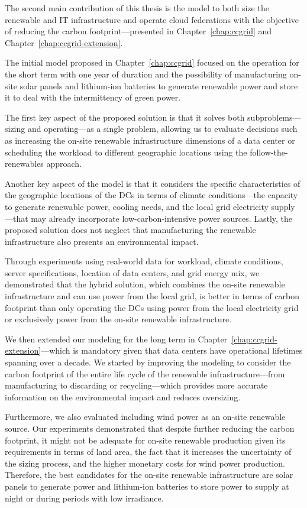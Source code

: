 The second main contribution of this thesis is the model to both size the renewable and IT infrastructure and operate cloud federations with the objective of reducing the carbon footprint---presented in Chapter~\ref{chap:ccgrid} and Chapter~\ref{chap:ccgrid-extension}. 

The initial model proposed in Chapter~\ref{chap:ccgrid} focused on the operation for the short term with one year of duration and the possibility of manufacturing on-site solar panels and lithium-ion batteries to generate renewable power and store it to deal with the intermittency of green power. 

The first key aspect of the proposed solution is that it solves both subproblems---sizing and operating---as a single problem, allowing us to evaluate decisions such as increasing the on-site renewable infrastructure dimensions of a data center or scheduling the workload to different geographic locations using the follow-the-renewables approach.


Another key aspect of the model is that it considers the specific characteristics of the geographic locations of the DCs in terms of climate conditions---the capacity to generate renewable power, cooling needs, and the local grid electricity supply---that may already incorporate low-carbon-intensive power sources. Lastly, the proposed solution does not neglect that manufacturing the renewable infrastructure also presents an environmental impact. 

Through experiments using real-world data for workload, climate conditions, server specifications, location of data centers, and grid energy mix,  we demonstrated that the hybrid solution, which combines the on-site renewable infrastructure and can use power from the local grid, is better in terms of carbon footprint than only operating the DCs using power from the local electricity grid or exclusively power from the on-site renewable infrastructure.

We then extended our modeling for the long term in Chapter~\ref{chap:ccgrid-extension}---which is mandatory given that data centers have operational lifetimes spanning over a decade. We started by improving the modeling to consider the carbon footprint of the entire life cycle of the renewable infrastructure---from manufacturing to discarding or recycling---which provides more accurate information on the environmental impact and reduces oversizing. 

Furthermore, we also evaluated including wind power as an on-site renewable source. Our experiments demonstrated that despite further reducing the carbon footprint, it might not be adequate for on-site renewable production given its requirements in terms of land area, the fact that it increases the uncertainty of the sizing process, and the higher monetary costs for wind power production. Therefore, the best candidates for the on-site renewable infrastructure are solar panels to generate power and lithium-ion batteries to store power to supply at night or during periods with low irradiance. 

